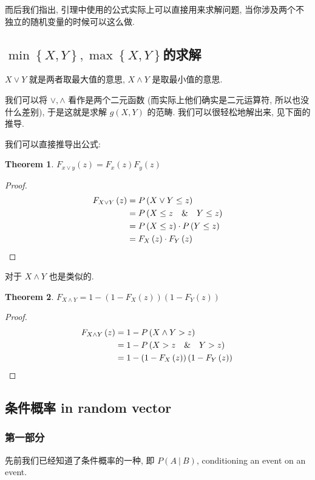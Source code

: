 \documentclass[a4paper, 10pt]{ctexart} %
\newtheorem{theorem}{Theorem}
\begin{document}
而后我们指出, 引理中使用的公式实际上可以直接用来求解问题, 当你涉及两个不独立的随机变量的时候可以这么做. 
\subsection{$\min  \left\{ X , Y \right\}, \max \left\{ X, Y\right\} $的求解}
$X \vee Y $ 就是两者取最大值的意思, $X \wedge Y$ 是取最小值的意思. 

我们可以将 $\vee , \wedge$ 看作是两个二元函数 (而实际上他们确实是二元运算符, 所以也没什么差别), 于是这就是求解 $g\left(X, Y\right)$ 
的范畴. 我们可以很轻松地解出来, 见下面的推导.


我们可以直接推导出公式: 
\begin{theorem}
    $F_{x \vee y} \left(z\right) = F_{x} \left(z\right) F_{y} \left(z\right)$  
\end{theorem}
\begin{proof}
\[
\begin{aligned}
F_{ X \vee Y} \left(z\right)  & = P\left( X \vee Y \le z\right)\\
& = P\left(X \le z \quad  \& \quad Y \le z\right)\\
& = P\left( X \le z\right) \cdot P\left(Y\le z\right)\\
& = F_{X } \left(z\right) \cdot  F_{Y} \left(z\right) \qedhere
\end{aligned}
\]
\end{proof}
对于 $X \wedge Y$ 也是类似的. 
\begin{theorem}
    $F_{ X\wedge Y} = 1 - \left(1 - F_{X} \left(z\right) \right) \left(1 -F_{Y} \left(z\right)\right)$
\end{theorem}
\begin{proof}
\[
\begin{aligned}
    F _{X \wedge Y} \left(z\right) & = 1- P\left( X \wedge Y > z\right)\\
    & = 1- P\left( X >z \quad \& \quad Y > z \right) \\
    & = 1 - \left(1 - F_{X} \left(z\right) \right) \left(1 - F_{Y} \left(z\right)\right)\qedhere
\end{aligned}
\]
\end{proof}

\subsection{条件概率 in random vector}
\subsubsection{第一部分}
先前我们已经知道了条件概率的一种, 即 $P\left(A\ | \ B\right)$, conditioning an event on an event.
\end{document}
